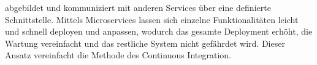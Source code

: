 abgebildet und kommuniziert mit anderen Services über eine definierte Schnittstelle. Mittels Microservices lassen sich einzelne Funktionalitäten leicht und schnell deployen und anpassen, wodurch das gesamte Deployment erhöht, die Wartung vereinfacht und das restliche System nicht gefährdet wird. \cite[S. 85 - 86]{kim_devops-handbuch_2017} Dieser Ansatz vereinfacht die Methode des Continuous Integration.










 











  











 





